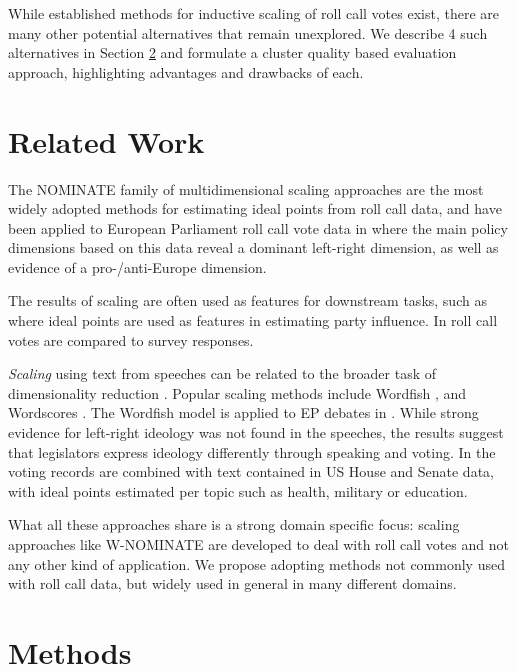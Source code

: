 \documentclass{llncs}
\begin{document}
While established methods for inductive scaling of roll call votes exist, there are many other potential alternatives that remain unexplored. We describe 4 such alternatives in Section \ref{sec:methods} and formulate a cluster quality based evaluation approach, highlighting advantages and drawbacks of each.

\section{Related Work}
\label{sec:relatedwork}

The NOMINATE \cite{poole2000congress} family of multidimensional scaling approaches are the most widely adopted methods for estimating ideal points from roll call data, and have been applied to European Parliament roll call vote data in \cite{hix2006dim} where the main policy dimensions based on this data reveal a dominant left-right dimension, as well as evidence of a pro-/anti-Europe dimension.

The results of scaling are often used as features for downstream tasks, such as \cite{mcelroy2012policy} where ideal points are used as features in estimating party influence. In \cite{gabel2007preferences} roll call votes are compared to survey responses.

\emph{Scaling} using text from speeches\cite{proksch2010position} can be related to the broader task of dimensionality reduction \cite{lowe2013there}. Popular scaling methods include Wordfish \cite{wordfish}, and Wordscores \cite{wordscores2003}. The Wordfish model is applied to EP debates in \cite{proksch2010position}. While strong evidence for left-right ideology was not found in the speeches, the results suggest that legislators express ideology differently through speaking and voting. In \cite{GuTF} the voting records are combined with text contained in US House and Senate data, with ideal points estimated per topic such as health, military or education.

What all these approaches share is a strong domain specific focus: scaling approaches like W-NOMINATE\cite{wnominate} are developed to deal with roll call votes and not any other kind of application. We propose adopting methods not commonly used with roll call data, but widely used in general in many different domains.

\section{Methods}
\label{sec:methods}
\end{document}
